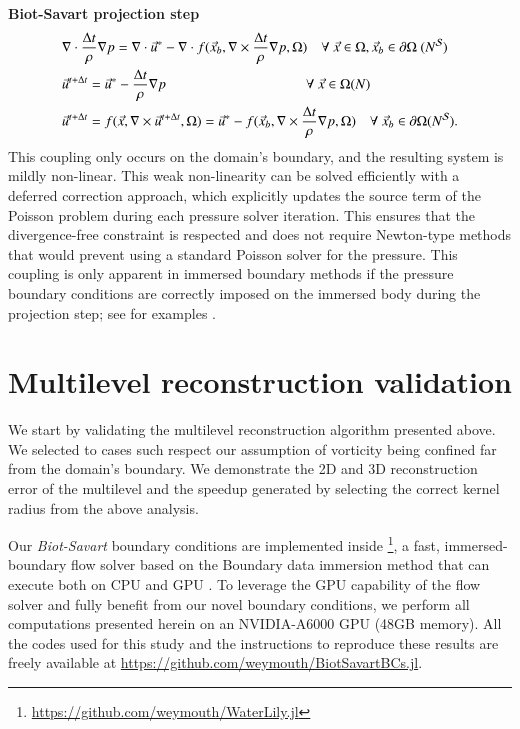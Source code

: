 \documentclass[preprint,12pt]{elsarticle}
\begin{document}
\textbf{Biot-Savart projection step}
\begin{align}
    &\nabla\cdot\frac{\Delta t}{\rho}\nabla p = \nabla\cdot \vec{u}^*-\nabla\cdot f(\vec{x}_b,\nabla\times\frac{\Delta t}{\rho}\nabla p,\Omega) \quad\forall\ \vec{x}\in\Omega, \vec{x}_b\in\partial\Omega\ (N^{\cal S})\\
    &\vec{u}^{t+\Delta t} = \vec{u}^*-\frac{\Delta t}{\rho}\nabla p \qquad\qquad\qquad\qquad\qquad\forall\ \vec{x}\in\Omega (N)\\
    &\vec{u}^{t+\Delta t} = f(\vec{x},\nabla\times \vec{u}^{t+\Delta t},\Omega)= \vec{u}^*-f(\vec{x}_b,\nabla\times\frac{\Delta t}{\rho}\nabla p,\Omega) \quad\forall\ \vec{x}_b\in\partial\Omega (N^{\cal S}).
\end{align}
This coupling only occurs on the domain's boundary, and the resulting system is mildly non-linear. This weak non-linearity can be solved efficiently with a deferred correction approach, which explicitly updates the source term of the Poisson problem during each pressure solver iteration. This ensures that the divergence-free constraint is respected and does not require Newton-type methods that would prevent using a standard Poisson solver for the pressure. This coupling is only apparent in immersed boundary methods if the pressure boundary conditions are correctly imposed on the immersed body during the projection step; see for examples \cite{Taira2007, Lauber2022}.

\section{Multilevel reconstruction validation}

We start by validating the multilevel reconstruction algorithm presented above. We selected to cases such respect our assumption of vorticity being confined far from the domain's boundary. We demonstrate the 2D and 3D reconstruction error of the multilevel and the speedup generated by selecting the correct kernel radius from the above analysis.

Our \emph{Biot-Savart} boundary conditions are implemented inside \textbf{}\footnote{\url{https://github.com/weymouth/WaterLily.jl}}, a fast, immersed-boundary flow solver based on the Boundary data immersion method \cite{Maertens2015} that can execute both on CPU and GPU \cite{Weymouth2023WaterLily.jl:Execution}. To leverage the GPU capability of the flow solver and fully benefit from our novel boundary conditions, we perform all computations presented herein on an NVIDIA-A6000 GPU (48GB memory). All the codes used for this study and the instructions to reproduce these results are freely available at \url{https://github.com/weymouth/BiotSavartBCs.jl}.
\end{document}
